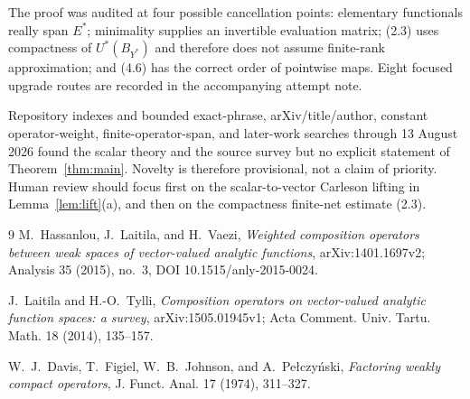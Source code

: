 \documentclass[11pt]{article}
\theoremstyle{remark}
\begin{document}
The proof was audited at four possible cancellation points: elementary
functionals really span $E^*$; minimality supplies an invertible evaluation
matrix; (2.3) uses compactness of $U^*(B_{Y^*})$ and therefore does not assume
finite-rank approximation; and (4.6) has the correct order of pointwise maps.
Eight focused upgrade routes are recorded in the accompanying attempt note.

Repository indexes and bounded exact-phrase, arXiv/title/author, constant
operator-weight, finite-operator-span, and later-work searches through
13 August 2026 found the scalar theory and the source survey but no explicit
statement of Theorem~\ref{thm:main}.  Novelty is therefore provisional, not a
claim of priority.  Human review should focus first on the scalar-to-vector
Carleson lifting in Lemma~\ref{lem:lift}(a), and then on the compactness
finite-net estimate (2.3).

\begin{thebibliography}{9}
M.~Hassanlou, J.~Laitila, and H.~Vaezi,
\emph{Weighted composition operators between weak spaces of vector-valued
analytic functions}, arXiv:1401.1697v2; Analysis 35 (2015), no.~3,
DOI 10.1515/anly-2015-0024.

J.~Laitila and H.-O.~Tylli,
\emph{Composition operators on vector-valued analytic function spaces: a
survey}, arXiv:1505.01945v1; Acta Comment. Univ. Tartu. Math. 18 (2014),
135--157.

W.~J.~Davis, T.~Figiel, W.~B.~Johnson, and A.~Pe\l czy\'nski,
\emph{Factoring weakly compact operators}, J. Funct. Anal. 17 (1974),
311--327.
\end{thebibliography}
\end{document}
